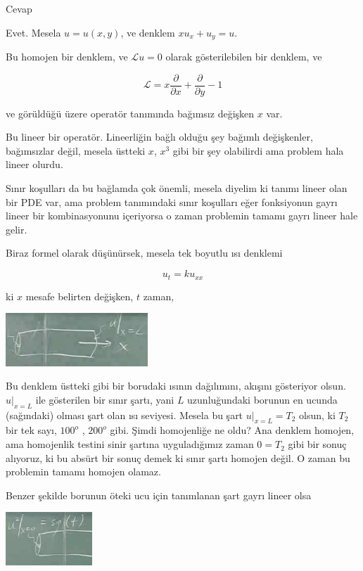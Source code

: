 \documentclass[12pt,fleqn]{article}\usepackage{../../common}
\begin{document}
Cevap 

Evet. Mesela $u=u(x,y)$, ve denklem $xu_x + u_y = u$. 

Bu homojen bir denklem, ve $\mathcal{L} u = 0$ olarak gösterilebilen bir
denklem, ve 

$$ \mathcal{L} = x\frac{\partial }{\partial x} + 
\frac{\partial }{\partial y} - 1
$$

ve görüldüğü üzere operatör tanımında bağımsız değişken $x$ var.

Bu lineer bir operatör. Lineerliğin bağlı olduğu şey bağımlı değişkenler,
bağımsızlar değil, mesela üstteki $x$, $x^3$ gibi bir şey olabilirdi ama
problem hala lineer olurdu. 

Sınır koşulları da bu bağlamda çok önemli, mesela diyelim ki tanımı lineer
olan bir PDE var, ama problem tanımındaki sınır koşulları eğer fonksiyonun
gayrı lineer bir kombinasyonunu içeriyorsa o zaman problemin tamamı gayrı
lineer hale gelir. 

Biraz formel olarak düşünürsek, mesela tek boyutlu ısı denklemi

$$ u_t = k u_{xx} $$

ki $x$ mesafe belirten değişken, $t$ zaman, 

\includegraphics[height=2cm]{1_8.png}

Bu denklem üstteki gibi bir borudaki ısının dağılımını, akışını gösteriyor
olsun. $u|_{x=L}$ ile gösterilen bir sınır şartı, yani $L$ uzunluğundaki
borunun en ucunda (sağındaki) olması şart olan ısı seviyesi. Mesela bu şart
$u|_{x=L} = T_2$ olsun, ki $T_2$ bir tek sayı, $100^o$ , $200^o$ gibi. Şimdi homojenliğe
ne oldu? Ana denklem homojen, ama homojenlik testini sinir şartına uyguladığımız
zaman $0 = T_2$ gibi bir sonuç alıyoruz, ki bu absürt bir sonuç demek ki sınır
şartı homojen değil. O zaman bu problemin tamamı homojen olamaz. 

Benzer şekilde borunun öteki ucu için tanımlanan şart gayrı lineer olsa

\includegraphics[height=2cm]{1_9.png}
\end{document}
